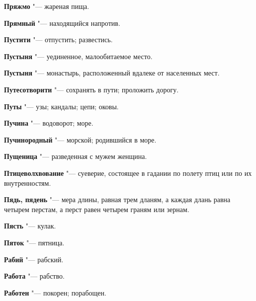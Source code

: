 \begin{mymulticols}{2}
\noindent\textbf{Пряжмо} "--- жареная пища. 




\noindent\textbf{Прямный} "--- находящийся напротив. 




\noindent\textbf{Пустити} "--- отпустить; развестись. 




\noindent\textbf{Пустыня} "--- уединенное, малообитаемое место. 




\noindent\textbf{Пустыня} "--- монастырь, расположенный вдалеке от населенных мест. 




\noindent\textbf{Путесотворити} "--- сохранять в пути; проложить дорогу. 




\noindent\textbf{Путы} "--- узы; кандалы; цепи; оковы. 




\noindent\textbf{Пучина} "--- водоворот; море. 




\noindent\textbf{Пучинородный} "--- морской; родившийся в море. 




\noindent\textbf{Пущеница} "--- разведенная с мужем женщина. 




\noindent\textbf{Птицеволхвование} "--- суеверие, состоящее в гадании по полету птиц или по их внутренностям. 




\noindent\textbf{Пядь, пядень} "--- мера длины, равная трем дланям, а каждая длань равна четырем перстам, а перст равен четырем граням или зернам. 




\noindent\textbf{Пясть} "--- кулак. 




\noindent\textbf{Пяток} "--- пятница. 









\noindent\textbf{Рабий} "--- рабский. 




\noindent\textbf{Работа} "--- рабство. 




\noindent\textbf{Работен} "--- покорен; порабощен. 





\end{mymulticols}

